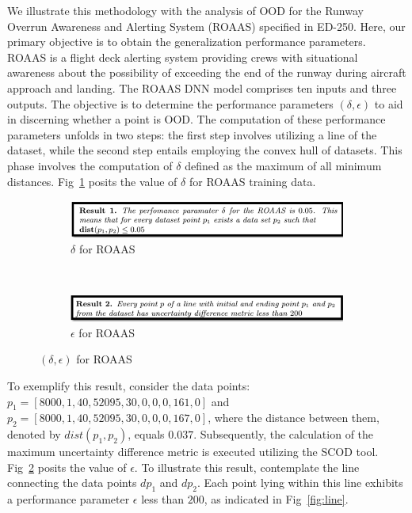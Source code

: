 We illustrate this methodology with the analysis of OOD for the Runway Overrun Awareness and Alerting System (ROAAS) specified in ED-250. Here, our primary objective is to obtain the generalization performance parameters. ROAAS is a flight deck alerting system providing crews with situational awareness about the possibility of exceeding the end of the runway during aircraft approach and landing. The ROAAS DNN model comprises ten inputs and three outputs. The objective is to determine the performance parameters 
$(\delta, \epsilon)$ to aid in discerning whether a point is OOD. The computation of these performance parameters unfolds in two steps: the first step involves utilizing a line of the dataset, while the second step entails employing the convex hull of datasets. This phase involves the computation of $\delta$ defined as the maximum of all minimum distances. Fig~\ref{fig:deltaR} posits the value of $\delta$ for ROAAS training data. 
\begin{figure}
\begin{subfigure}{.24\textwidth}
    \includegraphics[width=2.0\linewidth]{Fig/OOD_result1.png}  
    \caption{$\delta$ for ROAAS}
    \label{fig:deltaR}
\end{subfigure}
\\
\begin{subfigure}{.24\textwidth}
    \includegraphics[width=2.0\linewidth]{Fig/OOD_result2.png}  
    \caption{$\epsilon$ for ROAAS}
    \label{fig:epsilonR}
 \end{subfigure}
\caption{$(\delta,\epsilon)$ for ROAAS}
\label{FIGURE LABEL}
\end{figure}
To exemplify this result, consider the data points: $p_1= [8000, 1, 40, 52095, 30, 0,0,0, 161, 0]$ and $p_2= [8000, 1, 40, 52095, 30, 0, 0, 0, 167, 0]$, where the distance between them, denoted by $dist(p_1, p_2)$, equals $0.037$. Subsequently, the calculation of the maximum uncertainty difference metric is executed utilizing the SCOD tool. Fig~\ref{fig:epsilonR} posits the value of $\epsilon$.  To illustrate this result, contemplate the line connecting the data points $dp_1$ and $dp_2$. Each point lying within this line exhibits a performance parameter $\epsilon$ less than $200$, as indicated in Fig~\ref{fig:line}.
